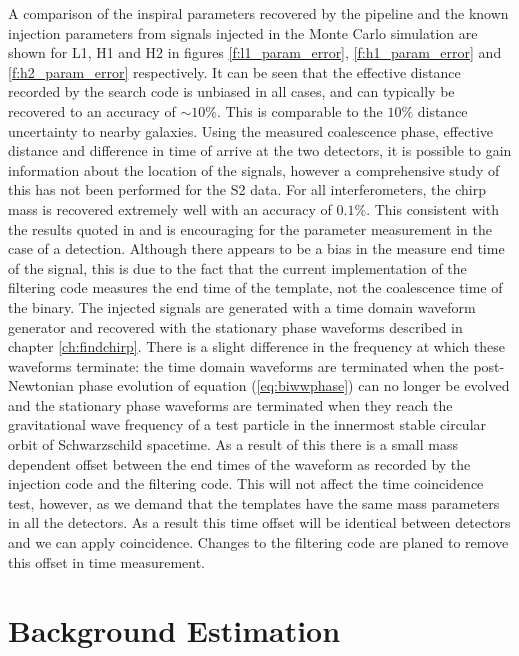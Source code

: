 A comparison of the inspiral parameters recovered by the pipeline and the
known injection parameters from signals injected in the Monte Carlo simulation
are shown for L1, H1 and H2 in figures \ref{f:l1_param_error},
\ref{f:h1_param_error} and \ref{f:h2_param_error} respectively. It can be seen
that the effective distance recorded by the search code is unbiased in all
cases, and can typically be recovered to an accuracy of $\sim 10\%$. This is
comparable to the $10\%$ distance uncertainty to nearby galaxies.  Using the
measured coalescence phase, effective distance and difference in time of
arrive at the two detectors, it is possible to gain information about the
location of the signals, however a comprehensive study of this has not been
performed for the S2 data. For all interferometers, the chirp mass is
recovered extremely well with an accuracy of $0.1\%$. This consistent with the
results quoted in \cite{Cutler:1994} and is encouraging for the parameter
measurement in the case of a detection. Although there appears to be a bias in
the measure end time of the signal, this is due to the fact that the current
implementation of the filtering code measures the end time of the template,
not the coalescence time of the binary. The injected signals are generated
with a time domain waveform generator\cite{LAL} and recovered with the
stationary phase waveforms described in chapter \ref{ch:findchirp}. There is a
slight difference in the frequency at which these waveforms terminate: the
time domain waveforms are terminated when the post-Newtonian phase evolution
of equation (\ref{eq:biwwphase}) can no longer be evolved and the stationary
phase waveforms are terminated when they reach the gravitational wave
frequency of a test particle in the innermost stable circular orbit of
Schwarzschild spacetime. As a result of this there is a small mass dependent
offset between the end times of the waveform as recorded by the injection code
and the filtering code. This will not affect the time coincidence test,
however, as we demand that the templates have the same mass parameters
in all the detectors. As a result this time offset will be identical between
detectors and we can apply coincidence. Changes to the filtering code are
planed to remove this offset in time measurement.

\section{Background Estimation}
\label{s:s2background}

